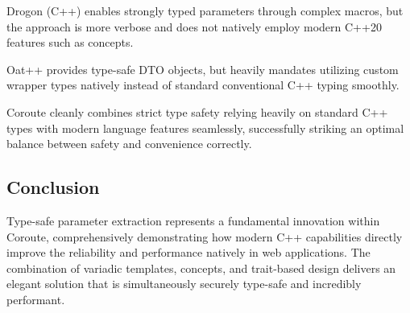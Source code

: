 Drogon (C++) enables strongly typed parameters through complex macros, but the approach is more verbose and does not natively employ modern C++20 features such as concepts.

Oat++ provides type-safe DTO objects, but heavily mandates utilizing custom wrapper types natively instead of standard conventional C++ typing smoothly.

Coroute cleanly combines strict type safety relying heavily on standard C++ types with modern language features seamlessly, successfully striking an optimal balance between safety and convenience correctly.

\subsection{Conclusion}

Type-safe parameter extraction represents a fundamental innovation within Coroute, comprehensively demonstrating how modern C++ capabilities directly improve the reliability and performance natively in web applications. The combination of variadic templates, concepts, and trait-based design delivers an elegant solution that is simultaneously securely type-safe and incredibly performant.
